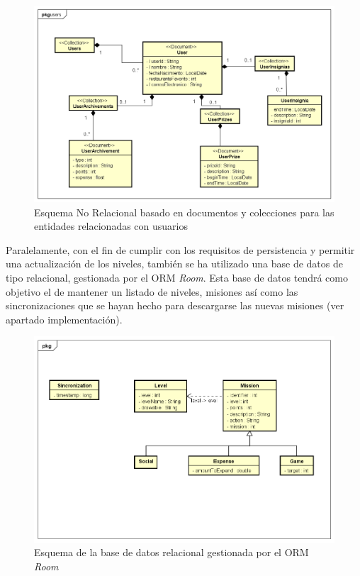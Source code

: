 \documentclass[twoside]{report}
\begin{document}
\begin{figure}[H]
\centering
\includegraphics[scale=0.5]{images/databaseNRusers}
\caption{Esquema No Relacional basado en documentos y colecciones para las entidades relacionadas con usuarios}
\end{figure}

Paralelamente, con el fin de cumplir con los requisitos de persistencia y permitir una actualización de los niveles, también se ha utilizado una base de datos de tipo relacional, gestionada por el ORM \textit{Room}. Esta base de datos tendrá como objetivo el de mantener un listado de niveles, misiones así como las sincronizaciones que se hayan hecho para descargarse las nuevas misiones (ver apartado implementación).

\begin{figure}[H]
\centering
\includegraphics[scale=0.5]{images/databaseRoom}
\caption{Esquema de la base de datos relacional gestionada por el ORM \textit{Room}}
\end{figure}
\end{document}
